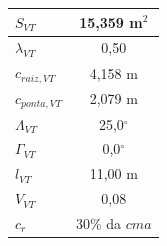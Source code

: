 \begin{table}[H]
{\begin{tabular}{l|c}
$S_{VT}$ & 15,359 m$^2$ \\ \hline
$\lambda_{VT}$ & 0,50 \\ \hline
$c_{raiz, VT}$ & 4,158 m \\ \hline
$c_{ponta, VT}$ & 2,079 m \\ \hline
$\Lambda_{VT}$ & 25,0$^\circ$ \\ \hline
$\Gamma_{VT}$ & 0,0$^\circ$ \\ \hline
$l_{VT}$ & 11,00 m \\ \hline
$V_{VT}$ & 0,08 \\ \hline
$c_{r}$ & 30\% da $cma$  \\ \hline
\end{tabular}%
}
\end{table}